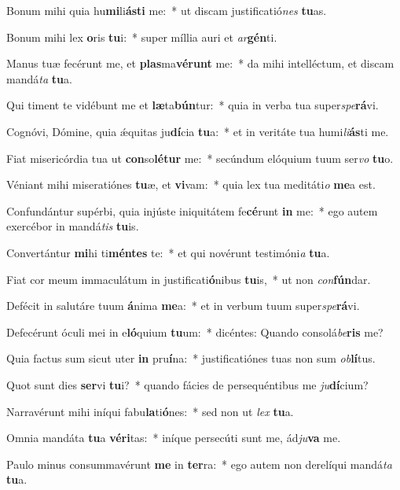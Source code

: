 \item Bonum mihi quia hu\textbf{mi}li\textbf{ás}\textbf{ti} me:~* ut discam justificatió\textit{nes} \textbf{tu}as.
\item Bonum mihi lex \textbf{o}ris \textbf{tu}i:~* super míllia auri et \textit{ar}\textbf{gén}ti.
\item Manus tuæ fecérunt me, et \textbf{plas}ma\textbf{vé}\textbf{runt} me:~* da mihi intelléctum, et discam mandá\textit{ta} \textbf{tu}a.
\item Qui timent te vidébunt me et \textbf{læ}ta\textbf{bún}tur:~* quia in verba tua super\textit{spe}\textbf{rá}vi.
\item Cognóvi, Dómine, quia ǽquitas ju\textbf{dí}cia \textbf{tu}a:~* et in veritáte tua humi\textit{li}\textbf{ás}ti me.
\item Fiat misericórdia tua ut \textbf{con}so\textbf{lé}\textbf{tur} me:~* secúndum elóquium tuum ser\textit{vo} \textbf{tu}o.
\item Véniant mihi miseratiónes \textbf{tu}æ, et \textbf{vi}vam:~* quia lex tua meditáti\textit{o} \textbf{me}a est.
\item Confundántur supérbi, quia injúste iniquitátem fe\textbf{cé}runt \textbf{in} me:~* ego autem exercébor in mandá\textit{tis} \textbf{tu}is.
\item Convertántur \textbf{mi}hi ti\textbf{mén}\textbf{tes} te:~* et qui novérunt testimóni\textit{a} \textbf{tu}a.
\item Fiat cor meum immaculátum in justificati\textbf{ó}nibus \textbf{tu}is,~* ut non \textit{con}\textbf{fún}dar.
\item Defécit in salutáre tuum \textbf{á}nima \textbf{me}a:~* et in verbum tuum super\textit{spe}\textbf{rá}vi.
\item Defecérunt óculi mei in e\textbf{ló}quium \textbf{tu}um:~* dicéntes: Quando consolá\textit{be}\textbf{ris} me?
\item Quia factus sum sicut uter \textbf{in} pru\textbf{í}na:~* justificatiónes tuas non sum \textit{ob}\textbf{lí}tus.
\item Quot sunt dies \textbf{ser}vi \textbf{tu}i?~* quando fácies de persequéntibus me \textit{ju}\textbf{dí}cium?
\item Narravérunt mihi iníqui fabu\textbf{la}ti\textbf{ó}nes:~* sed non ut \textit{lex} \textbf{tu}a.
\item Omnia mandáta \textbf{tu}a \textbf{vé}\textbf{ri}tas:~* iníque persecúti sunt me, ád\textit{ju}\textbf{va} me.
\item Paulo minus consummavérunt \textbf{me} in \textbf{ter}ra:~* ego autem non derelíqui mandá\textit{ta} \textbf{tu}a.
